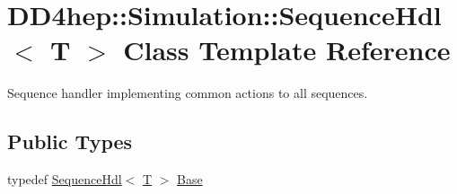 \hypertarget{class_d_d4hep_1_1_simulation_1_1_sequence_hdl}{
\section{DD4hep::Simulation::SequenceHdl$<$ T $>$ Class Template Reference}
\label{class_d_d4hep_1_1_simulation_1_1_sequence_hdl}
}


Sequence handler implementing common actions to all sequences.  
\subsection*{Public Types}
\begin{DoxyCompactItemize}
\item 
typedef \hyperlink{class_d_d4hep_1_1_simulation_1_1_sequence_hdl}{SequenceHdl}$<$ \hyperlink{class_t}{T} $>$ \hyperlink{class_d_d4hep_1_1_simulation_1_1_sequence_hdl_a447b2bee9267559ffef742eef84fb1cc}{Base}
\end{DoxyCompactItemize}
